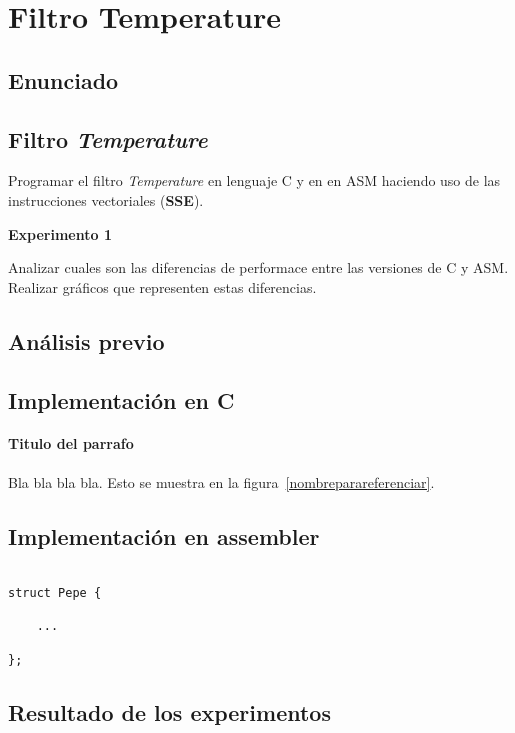 \section{Filtro Temperature}
\subsection{Enunciado}

\subsection*{Filtro \textit{Temperature}}

  Programar el filtro \textit{Temperature} en lenguaje C y en en ASM haciendo uso de 
  las instrucciones vectoriales (\textbf{SSE}).


\vspace*{0.3cm} \noindent
\textbf{Experimento 1}

  Analizar cuales son las diferencias de performace entre las versiones de C y ASM. 
  Realizar gráficos que representen estas diferencias.
  
\subsection{An\'alisis previo}

\subsection{Implementaci\'on en C}
\paragraph{\textbf{Titulo del parrafo} } Bla bla bla bla.
Esto se muestra en la figura~\ref{nombreparareferenciar}.
\subsection{Implementaci\'on en assembler}
\begin{codesnippet}
\begin{verbatim}

struct Pepe {

    ...

};
\end{verbatim}
\end{codesnippet}
\subsection{Resultado de los experimentos}


